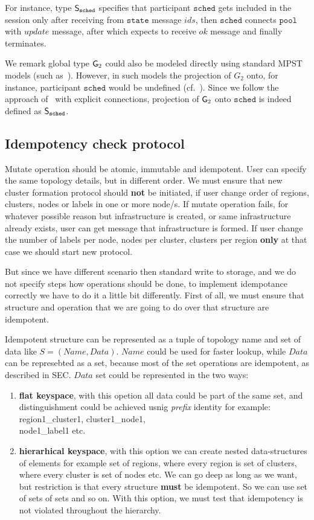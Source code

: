 For instance, type ${\mathsf S}_\mathtt{sched}$ specifies that participant $\mathtt{sched}$ gets included in the session only after receiving from $\mathtt{state}$ message $\mathit{ids}$, then $\mathtt{sched}$ connects $\mathtt{pool}$ with $\mathit{update}$ message, after which expects to receive $\mathit{ok}$ message and finally terminates. 

We remark global type ${\sf G}_2$ could also be modeled directly using standard MPST models (such as~\cite{HondaYC08}). However, in such models the projection of $G_2$ onto, for instance, participant $\mathtt{sched}$ would be undefined (cf.~\cite{HuY17}).
Since we follow the approach of~\cite{HuY17} with explicit connections, projection of ${\sf G}_2$ onto $\mathtt{sched}$ is indeed defined as ${\mathsf S}_\mathtt{sched}$.
%
%
\subsection{Idempotency check protocol}\label{sec:idempotency_protocol}
%
Mutate operation should be atomic, immutable and idempotent. User can specify the same topology details, but in different order. We must ensure that new cluster formation protocol should \textbf{not} be initiated, if user change order of regions, clusters, nodes or labels in one or more node/s. If mutate operation fails, for whatever possible reason but infrastructure is created, or same infrastructure already exists, user can get message that infrastructure is formed. If user change the number of labels per node, nodes per cluster, clusters per region \textbf{only} at that case we should start new protocol.

But since we have different scenario then standard write to storage, and we do not specify steps how operations should be done, to implement idempotance correctly we have to do it a little bit differently. First of all, we must ensure that structure and operation that we are going to do over that structure are idempotent.

Idempotent structure can be represented as a tuple of topology name and set of data like $S=(Name, Data)$. $Name$ could be used for faster lookup, while $Data$ can be represebted as a set, because most of the set operations are idempotent, as described in SEC. $Data$ set could be represented in the two ways:

\begin{enumerate}[start=1,label={(\bfseries \arabic*)}]
	\item \textbf{flat keyspace}, with this opetion all data could be part of the same set, and distinguishment could be achieved usnig \textit{prefix} identity for example: region1\_cluster1, cluster1\_node1, \\node1\_label1 etc.
	\item \textbf{hierarhical keyspace}, with this option we can create nested data-structures of elements for example set of regions, where every region is set of clusters, where every cluster is set of nodes etc. We can go deep as long as we want, but restriction is that every structure \textbf{must} be idempotent. So we can use set of sets of sets and so on. With this option, we must test that idempotency is not violated throughout the hierarchy.
\end{enumerate}

